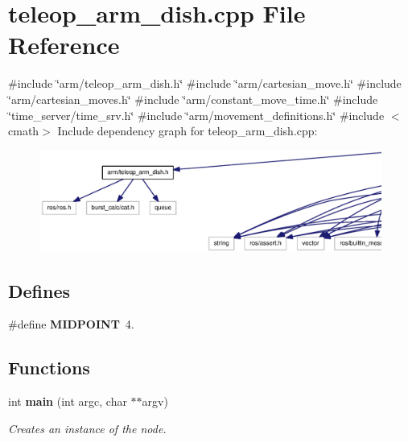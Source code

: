 \section{teleop\-\_\-arm\-\_\-dish.\-cpp \-File \-Reference}
\label{teleop__arm__dish_8cpp}
{\ttfamily \#include \char`\"{}arm/teleop\-\_\-arm\-\_\-dish.\-h\char`\"{}}\*
{\ttfamily \#include \char`\"{}arm/cartesian\-\_\-move.\-h\char`\"{}}\*
{\ttfamily \#include \char`\"{}arm/cartesian\-\_\-moves.\-h\char`\"{}}\*
{\ttfamily \#include \char`\"{}arm/constant\-\_\-move\-\_\-time.\-h\char`\"{}}\*
{\ttfamily \#include \char`\"{}time\-\_\-server/time\-\_\-srv.\-h\char`\"{}}\*
{\ttfamily \#include \char`\"{}arm/movement\-\_\-definitions.\-h\char`\"{}}\*
{\ttfamily \#include $<$cmath$>$}\*
\-Include dependency graph for teleop\-\_\-arm\-\_\-dish.\-cpp\-:\nopagebreak
\begin{figure}[H]
\begin{center}
\leavevmode
\includegraphics[width=350pt]{teleop__arm__dish_8cpp__incl}
\end{center}
\end{figure}
\subsection*{\-Defines}
\begin{DoxyCompactItemize}
\item 
\#define {\bf \-M\-I\-D\-P\-O\-I\-N\-T}~4.
\end{DoxyCompactItemize}
\subsection*{\-Functions}
\begin{DoxyCompactItemize}
\item 
int {\bf main} (int argc, char $\ast$$\ast$argv)
\begin{DoxyCompactList}\small\item\em \-Creates an instance of the node. \end{DoxyCompactList}\end{DoxyCompactItemize}



